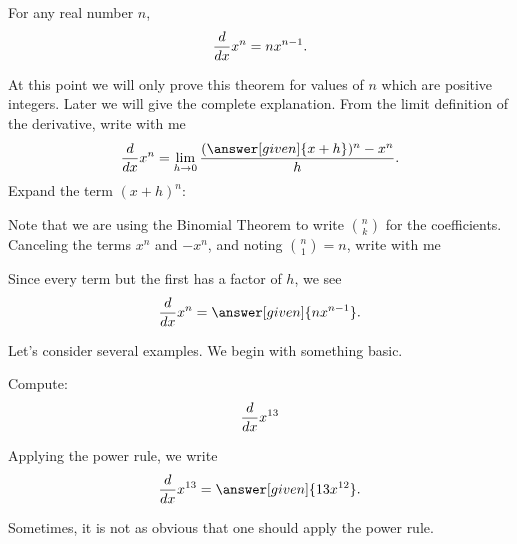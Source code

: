 \documentclass{ximera}
\begin{document}
\begin{theorem}\label{T:powerrule}
For any real number $n$, 
\[
\frac{d}{\mathop{}\!d x} x^n = n x^{n-1}.
\]

\begin{explanation}
At this point we will only prove this theorem for values of $n$ which
are positive integers. Later we will give the complete explanation.
From the limit definition of the derivative, write with me
\[
\ddx x^n = \lim_{ h\to0} \frac{(\answer[given]{x+ h})^n-x^n}{h}.
\]
Expand the term $(x+h)^n$:
\begin{image}
\end{image}
Note that we are using the Binomial Theorem to write $\binom{n}{k}$
for the coefficients. Canceling the terms $x^n$ and $-x^n$, and noting
$\binom{n}{1}= n$, write with me
\begin{image}
\end{image}

Since every term but the first has a factor of $h$, we see
\[
\ddx x^n = \answer[given]{nx^{n-1}}.
\]
\end{explanation}
\end{theorem}

Let's consider several examples. We begin with something basic.

\begin{example}
Compute:
\[
\frac{d}{\mathop{}\!d x} x^{13}
\]
\begin{explanation}
Applying the power rule, we write
\[
\ddx x^{13} = \answer[given]{13x^{12}}.
\]
\end{explanation}
\end{example}

Sometimes, it is not as obvious that one should apply the power rule.
\end{document}
